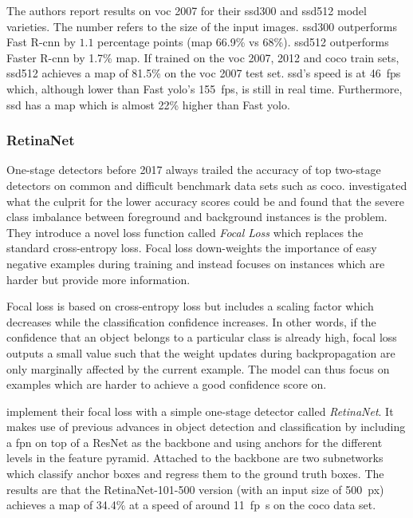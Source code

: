 \documentclass[draft,final]{vutinfth} %
\begin{document}
The authors report results on \gls{voc} 2007 for their \gls{ssd}300
and \gls{ssd}512 model varieties. The number refers to the size of the
input images. \gls{ssd}300 outperforms Fast R-\gls{cnn} by $1.1$
percentage points (\gls{map} 66.9\% vs 68\%). \gls{ssd}512 outperforms
Faster R-\gls{cnn} by 1.7\% \gls{map}. If trained on the \gls{voc}
2007, 2012 and \gls{coco} train sets, \gls{ssd}512 achieves a
\gls{map} of 81.5\% on the \gls{voc} 2007 test set. \gls{ssd}'s speed
is at \qty{46}{fps} which, although lower than Fast \gls{yolo}'s
\qty{155}{fps}, is still in real time. Furthermore, \gls{ssd} has a
\gls{map} which is almost 22\% higher than Fast \gls{yolo}.

\subsubsection{RetinaNet}
\label{sssec:theory-retinanet}

One-stage detectors before 2017 always trailed the accuracy of top
two-stage detectors on common and difficult benchmark data sets such
as \gls{coco}. \textcite{lin2017b} investigated what the culprit for
the lower accuracy scores could be and found that the severe class
imbalance between foreground and background instances is the
problem. They introduce a novel loss function called \emph{Focal Loss}
which replaces the standard cross-entropy loss. Focal loss
down-weights the importance of easy negative examples during training
and instead focuses on instances which are harder but provide more
information.

Focal loss is based on cross-entropy loss but includes a scaling
factor which decreases while the classification confidence
increases. In other words, if the confidence that an object belongs to
a particular class is already high, focal loss outputs a small value
such that the weight updates during backpropagation are only
marginally affected by the current example. The model can thus focus
on examples which are harder to achieve a good confidence score on.

\textcite{lin2017b} implement their focal loss with a simple one-stage
detector called \emph{RetinaNet}. It makes use of previous advances in
object detection and classification by including a \gls{fpn} on top of
a ResNet \cite{he2016} as the backbone and using anchors for the
different levels in the feature pyramid. Attached to the backbone are
two subnetworks which classify anchor boxes and regress them to the
ground truth boxes. The results are that the RetinaNet-101-500 version
(with an input size of \qty{500}{px}) achieves a \gls{map} of 34.4\%
at a speed of around \qty{11}{fp\s} on the \gls{coco} data set.
\end{document}
